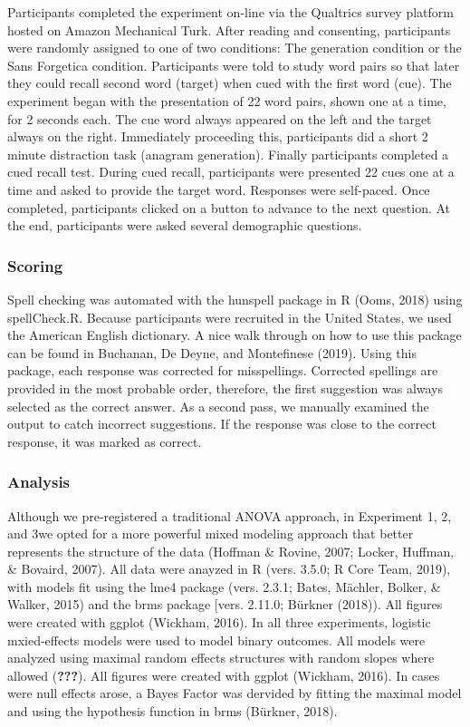 \documentclass[english,pdf]{apa6}
\begin{document}
Participants completed the experiment on-line via the Qualtrics survey platform hosted on Amazon Mechanical Turk. After reading and consenting, participants were randomly assigned to one of two conditions: The generation condition or the Sans Forgetica condition. Participants were told to study word pairs so that later they could recall second word (target) when cued with the first word (cue). The experiment began with the presentation of 22 word pairs, shown one at a time, for 2 seconds each. The cue word always appeared on the left and the target always on the right. Immediately proceeding this, participants did a short 2 minute distraction task (anagram generation). Finally participants completed a cued recall test. During cued recall, participants were presented 22 cues one at a time and asked to provide the target word. Responses were self-paced. Once completed, participants clicked on a button to advance to the next question. At the end, participants were asked several demographic questions.

\hypertarget{scoring}{%
\subsubsection{Scoring}\label{scoring}}

Spell checking was automated with the hunspell package in R (Ooms, 2018) using spellCheck.R. Because participants were recruited in the United States, we used the American English dictionary. A nice walk through on how to use this package can be found in Buchanan, De Deyne, and Montefinese (2019). Using this package, each response was corrected for misspellings. Corrected spellings are provided in the most probable order, therefore, the first suggestion was always selected as the correct answer. As a second pass, we manually examined the output to catch incorrect suggestions. If the response was close to the correct response, it was marked as correct.

\hypertarget{analysis}{%
\subsubsection{Analysis}\label{analysis}}

Although we pre-registered a traditional ANOVA approach, in Experiment 1, 2, and 3we opted for a more powerful mixed modeling approach that better represents the structure of the data (Hoffman \& Rovine, 2007; Locker, Huffman, \& Bovaird, 2007). All data were anayzed in R (vers. 3.5.0; R Core Team, 2019), with models fit using the lme4 package (vers. 2.3.1; Bates, Mächler, Bolker, \& Walker, 2015) and the brms package {[}vers. 2.11.0; Bürkner (2018)). All figures were created with ggplot (Wickham, 2016). In all three experiments, logistic mxied-effects models were used to model binary outcomes. All models were analyzed using maximal random effects structures with random slopes where allowed ({\textbf{???}}). All figures were created with ggplot (Wickham, 2016). In cases were null effects arose, a Bayes Factor was dervided by fitting the maximal model and using the hypothesis function in brms (Bürkner, 2018).
\end{document}

